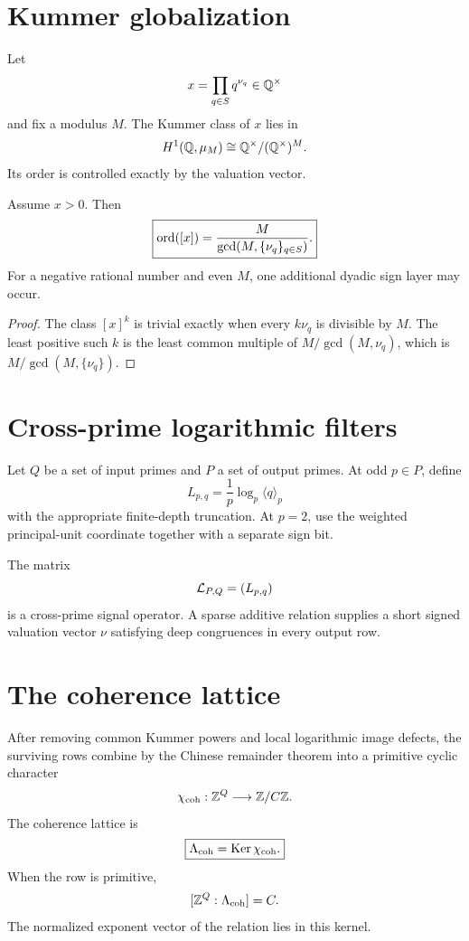 \section{Kummer globalization}
Let
\[
x=\prod_{q\in S}q^{\nu_q}\in\mathbb Q^\times
\]
and fix a modulus $M$. The Kummer class of $x$ lies in
\[
H^1(\mathbb Q,\mu_M)
\cong
\mathbb Q^\times/(\mathbb Q^\times)^M.
\]
Its order is controlled exactly by the valuation vector.

\begin{theorem}
Assume $x>0$. Then
\[
\boxed{
\operatorname{ord}([x])
=
\frac{M}{\gcd(M,\{\nu_q\}_{q\in S})}.
}
\]
For a negative rational number and even $M$, one additional dyadic sign layer may occur.
\end{theorem}

\begin{proof}
The class $[x]^k$ is trivial exactly when every $k\nu_q$ is divisible by $M$. The least positive such $k$ is the least common multiple of $M/\gcd(M,\nu_q)$, which is $M/\gcd(M,\{\nu_q\})$.
\end{proof}

\section{Cross-prime logarithmic filters}
Let $Q$ be a set of input primes and $P$ a set of output primes. At odd $p\in P$, define
\[
L_{p,q}
=
\frac1p\log_p\langle q\rangle_p
\]
with the appropriate finite-depth truncation. At $p=2$, use the weighted principal-unit coordinate together with a separate sign bit.

The matrix
\[
\mathcal L_{P,Q}=(L_{p,q})
\]
is a cross-prime signal operator. A sparse additive relation supplies a short signed valuation vector $\nu$ satisfying deep congruences in every output row.

\section{The coherence lattice}
After removing common Kummer powers and local logarithmic image defects, the surviving rows combine by the Chinese remainder theorem into a primitive cyclic character
\[
\chi_{\mathrm{coh}}:\mathbb Z^Q\longrightarrow\mathbb Z/C\mathbb Z.
\]
The coherence lattice is
\[
\boxed{
\Lambda_{\mathrm{coh}}
=
\operatorname{Ker}\chi_{\mathrm{coh}}.
}
\]
When the row is primitive,
\[
[\mathbb Z^Q:\Lambda_{\mathrm{coh}}]=C.
\]
The normalized exponent vector of the relation lies in this kernel.

